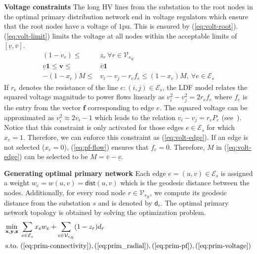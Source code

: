 \documentclass[sigconf]{acmart}
\begin{document}
\noindent\textbf{Voltage constraints}
The long HV lines from the substation to the root nodes in the optimal primary distribution network end in voltage regulators which ensure that the root nodes have a voltage of $1$pu. This is ensured by (\ref{eq:volt-root}). (\ref{eq:volt-limit}) limits the voltage at all nodes within the acceptable limits of $[\underline{v},\overline{v}]$.
\begin{subequations}
	\begin{align}
		(1-v_r)\leq &z_r~\forall r\in\mathcal{V}_{s_R}\label{eq:volt-root}\\
		\underline{v}\mathbf{1}\leq \mathbf{v}\leq &\overline{v}\mathbf{1}\label{eq:volt-limit}\\
		-(1-x_e)M\leq &v_i-v_j-r_ef_e\leq(1-x_e)M,~\forall e\in\mathcal{E}_s\label{eq:volt-edge}
	\end{align}
	\label{eq:prim-voltage}
\end{subequations}
If $r_e$ denotes the resistance of the line $e:(i,j)\in\mathcal{E}_s$, the LDF model relates the squared voltage magnitude to power flows linearly as $v_i^2-v_j^2=2r_ef_e$ where $f_e$ is the entry from the vector $\mathbf{f}$ corresponding to edge $e$. The squared voltage can be approximated as $v_i^2\approx 2v_i-1$ which leads to the relation $v_i-v_j=r_eP_e$ (see~\cite{ldf}). Notice that this constraint is only activated for those edges $e\in\mathcal{E}_s$ for which $x_e=1$. Therefore, we can enforce this constraint as (\ref{eq:volt-edge}). If an edge is not selected ($x_e=0$), (\ref{eq:pf-flow}) ensures that $f_e=0$. Therefore, $M$ in (\ref{eq:volt-edge}) can be selected to be $M=\overline{v}-\underline{v}$.

\noindent\textbf{Generating optimal primary network} Each edge $e=(u,v)\in\mathcal{E}_s$ is assigned a weight $w_e=w(u,v)=\mathsf{dist}(u,v)$ which is the geodesic distance between the nodes. Additionally, for every road node $r\in\mathcal{V}_{s_R}$, we compute its geodesic distance from the substation $s$ and is denoted by $\mathsf{d}_r$. The optimal primary network topology is obtained by solving the optimization problem.
\begin{equation}
	\begin{aligned}
		\min_{\mathbf{x},\mathbf{y},\mathbf{z}}&~\sum_{e\in\mathcal{E}_s}x_ew_e+\sum_{e\in\mathcal{V}_{s_R}}(1-z_r)d_r\\
		\textrm{s.to.}&~(\ref{eq:prim-connectivity}),(\ref{eq:prim_radial}),(\ref{eq:prim-pf}),(\ref{eq:prim-voltage})
	\end{aligned}
\end{equation}
\end{document}

